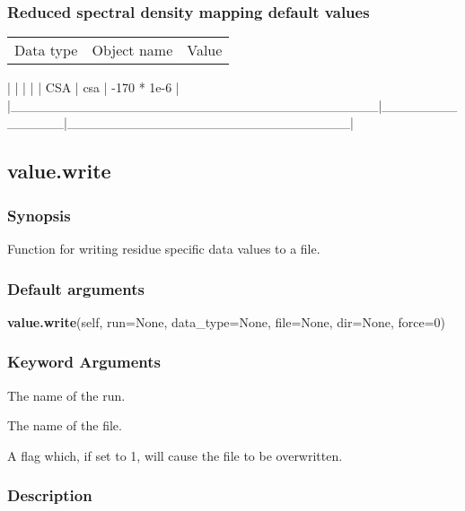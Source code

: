 \subsubsection{Reduced spectral density mapping default values}



\begin{tabular}{ccc}
Data type & Object name & Value \\
\end{tabular}
|                                       |              |                              |
| CSA                                   | csa          | -170 * 1e-6                  |
|\_\_\_\_\_\_\_\_\_\_\_\_\_\_\_\_\_\_\_\_\_\_\_\_\_\_\_\_\_\_\_\_\_\_\_\_\_\_\_|\_\_\_\_\_\_\_\_\_\_\_\_\_\_|\_\_\_\_\_\_\_\_\_\_\_\_\_\_\_\_\_\_\_\_\_\_\_\_\_\_\_\_\_\_|


\newpage

\subsection{value.write}


\subsubsection{Synopsis}

Function for writing residue specific data values to a file.

\subsubsection{Default arguments}

\textsf{\textbf{value.write}(self, run=None, data\_type=None, file=None, dir=None, force=0)}


\subsubsection{Keyword Arguments}

  The name of the run.

  The name of the file.

  A flag which, if set to 1, will cause the file to be overwritten.

\subsubsection{Description}

